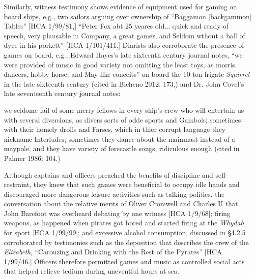 \begin{styleStandard}
Similarly, witness testimony shows evidence of equipment used for gaming on board ships, e.g., two sailors arguing over ownership of “Baggamon [backgammon] Tables” [HCA 1/99/81,] “Peter Fox abt 25 yeares old... quick and ready of speech, very plausable in Company, a great gamer, and Seldom wthout a ball of dyce in his porkett” [HCA 1/101/411.] Diarists also corroborate the presence of games on board, e.g., Edward Hayes’s late sixteenth century journal notes, “we were provided of music in good variety not omitting the least toys, as morris dancers, hobby horse, and May-like conceits” on board the 10-ton frigate \textit{Squirrel} in the late sixteenth century (cited in Bicheno 2012: 173,) and Dr. John Covel’s late seventeenth century journal notes:
\end{styleStandard}

\begin{styleStandard}
we seldome fail of some merry fellows in every ship’s crew who will entertain us with several diversions, as divers sorts of odde sports and Gambols; sometimes with their homely drolls and Farses, which in thier corrupt language they nickname Interludes; sometimes they dance about the mainmast instead of a maypole, and they have variety of forecastle songs, ridiculous enough (cited in Palmer 1986: 104.)
\end{styleStandard}

\begin{styleStandard}
Although captains and officers preached the benefits of discipline and self-restraint, they knew that such games were beneficial to occupy idle hands and discouraged more dangerous leisure activities such as talking politics, the conversation about the relative merits of Oliver Cromwell and Charles II that John Barefoot was overheard debating by one witness [HCA 1/9/68]; firing weapons, as happened when pirates got bored and started firing at the \textit{Whydah} for sport [HCA 1/99/99]; and excessive alcohol consumption, discussed in §4.2.5 corroborated by testimonies such as the deposition that describes the crew of the \textit{Elizabeth, }“Carouzing and Drinking with the Rest of the Pyrates” [HCA 1/99/46.] Officers therefore permitted games and music as controlled social acts that helped relieve tedium during uneventful hours at sea. 
\end{styleStandard}

